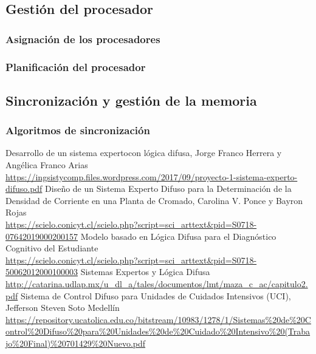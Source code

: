 \documentclass[a4paper, 11pt, titlepage]{article}
\begin{document}
    \subsection{Gestión del procesador}

        \subsubsection{Asignación de los procesadores}

        \subsubsection{Planificación del procesador}

    \subsection{Sincronización y gestión de la memoria}

        \subsubsection{Algoritmos de sincronización}

\newpage
\begin{thebibliography}{X}
    \bibitem{} Desarrollo de un sistema expertocon lógica difusa, Jorge Franco Herrera y Angélica Franco Arias \\ \url{https://ingsistycomp.files.wordpress.com/2017/09/proyecto-1-sistema-experto-difuso.pdf}
    \bibitem{} Diseño de un Sistema Experto Difuso para la Determinación de la Densidad de Corriente en una Planta de Cromado, Carolina V. Ponce y Bayron Rojas \\ \url{https://scielo.conicyt.cl/scielo.php?script=sci_arttext&pid=S0718-07642019000200157}
    \bibitem{} Modelo basado en Lógica Difusa para el Diagnóstico Cognitivo del Estudiante \\ \url{https://scielo.conicyt.cl/scielo.php?script=sci_arttext&pid=S0718-50062012000100003}
    \bibitem{} Sistemas Expertos y Lógica Difusa \\ \url{http://catarina.udlap.mx/u_dl_a/tales/documentos/lmt/maza_c_ac/capitulo2.pdf}
    \bibitem{} Sistema de Control Difuso para Unidades de Cuidados Intensivos (UCI), Jefferson Steven Soto Medellín \\ \url{https://repository.ucatolica.edu.co/bitstream/10983/1278/1/Sistemas%20de%20Control%20Difuso%20para%20Unidades%20de%20Cuidado%20Intensivo%20(Trabajo%20Final)%20701429%20Nuevo.pdf}
\end{thebibliography}
\end{document}
